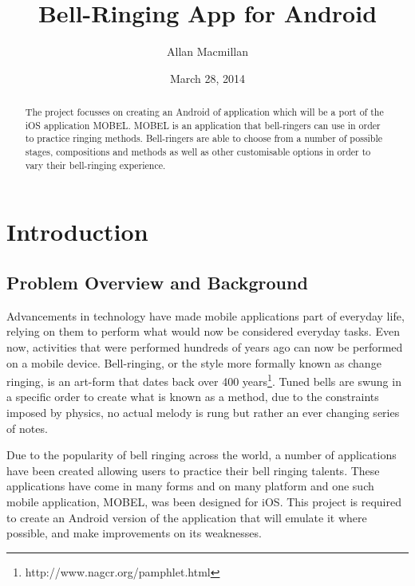 \documentclass{l4proj}
\begin{document}
\title{Bell-Ringing App for Android}
\author{Allan Macmillan}
\date{March 28, 2014}
\maketitle

\begin{abstract}
The project focusses on creating an Android of application which will be a port of the iOS application MOBEL. MOBEL is an application that bell-ringers can use in order to practice ringing methods. Bell-ringers are able to choose from a number of possible stages, compositions and methods as well as other customisable options in order to vary their bell-ringing experience.  
\end{abstract}

\educationalconsent
%
%
\tableofcontents

\chapter{Introduction}

\section{Problem Overview and Background}
Advancements in technology have made mobile applications part of everyday life, relying on them to perform what would now be considered everyday tasks.  Even now, activities that were performed hundreds of years ago can now be performed on a mobile device.  Bell-ringing, or the style more formally known as change ringing, is an art-form that dates back over 400 years\footnote{http://www.nagcr.org/pamphlet.html}.  Tuned bells are swung in a specific order to create what is known as a method, due to the constraints imposed by physics, no actual melody is rung but rather an ever changing series of notes.

Due to the popularity of bell ringing across the world, a number of applications have been created allowing users to practice their bell ringing talents. These applications have come in many forms and on many platform and one such mobile application, MOBEL, was been designed for iOS. This project is required to create an Android version of the application that will emulate it where possible, and make improvements on its weaknesses.  
\end{document}
